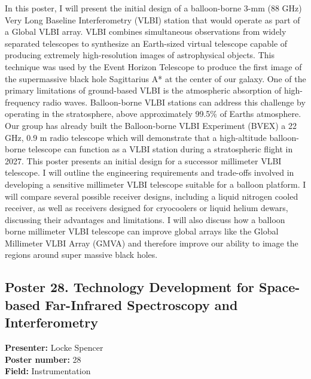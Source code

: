 In this poster, I will present the initial design of a balloon-borne 3-mm (88 GHz) Very Long Baseline Interferometry (VLBI) station that would operate as part of a Global VLBI array. VLBI combines simultaneous observations from widely separated telescopes to synthesize an Earth-sized virtual telescope capable of producing extremely high-resolution images of astrophysical objects. This technique was used by the Event Horizon Telescope to produce the first image of the supermassive black hole Sagittarius A* at the center of our galaxy. One of the primary limitations of ground-based VLBI is the atmospheric absorption of high-frequency radio waves. Balloon-borne VLBI stations can address this challenge by operating in the stratosphere, above approximately 99.5\% of Earths atmosphere. Our group has already built the Balloon-borne VLBI Experiment (BVEX) a 22 GHz, 0.9 m radio telescope which will demonstrate that a high-altitude balloon-borne telescope can function as a VLBI station during a stratospheric flight in 2027. This poster presents an initial design for a successor millimeter VLBI telescope. I will outline the engineering requirements and trade-offs involved in developing a sensitive millimeter VLBI telescope suitable for a balloon platform. I will compare several possible receiver designs, including a liquid nitrogen cooled receiver, as well as receivers designed for cryocoolers or liquid helium dewars, discussing their advantages and limitations. I will also discuss how a balloon borne millimeter VLBI telescope can improve global arrays like the Global Millimeter VLBI Array (GMVA) and therefore improve our ability to image the regions around super massive black holes.

\hypertarget{poster-abstract-talk-267}{}\label{poster-abstract-page-talk-267}
\subsection*{Poster 28. Technology Development for Space-based Far-Infrared Spectroscopy and Interferometry}
\textbf{Presenter:} Locke Spencer\\
\textbf{Poster number:} 28\\
\textbf{Field:} Instrumentation


